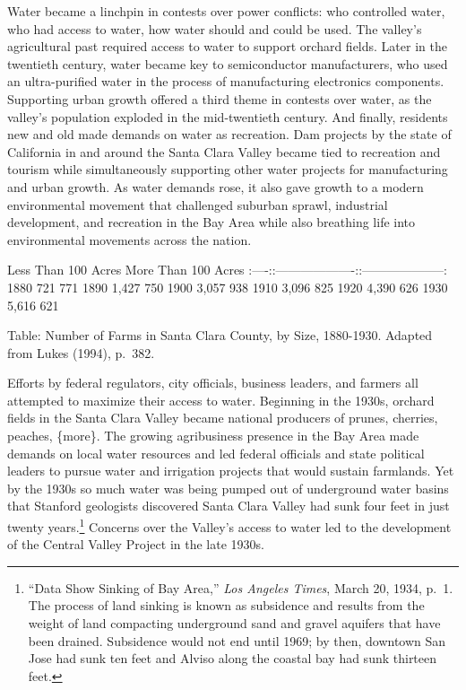 \documentclass[11pt,article,oneside]{memoir}
\begin{document}
Water became a linchpin in contests over power conflicts: who controlled
water, who had access to water, how water should and could be used. The
valley's agricultural past required access to water to support orchard
fields. Later in the twentieth century, water became key to
semiconductor manufacturers, who used an ultra-purified water in the
process of manufacturing electronics components. Supporting urban growth
offered a third theme in contests over water, as the valley's population
exploded in the mid-twentieth century. And finally, residents new and
old made demands on water as recreation. Dam projects by the state of
California in and around the Santa Clara Valley became tied to
recreation and tourism while simultaneously supporting other water
projects for manufacturing and urban growth. As water demands rose, it
also gave growth to a modern environmental movement that challenged
suburban sprawl, industrial development, and recreation in the Bay Area
while also breathing life into environmental movements across the
nation.

\textbar{} \textbar{} Less Than 100 Acres \textbar{} More Than 100 Acres
\textbar{}
\textbar{}:----:\textbar{}:-------------------:\textbar{}:--------------------:\textbar{}
\textbar{} 1880 \textbar{} 721 \textbar{} 771 \textbar{} \textbar{} 1890
\textbar{} 1,427 \textbar{} 750 \textbar{} \textbar{} 1900 \textbar{}
3,057 \textbar{} 938 \textbar{} \textbar{} 1910 \textbar{} 3,096
\textbar{} 825 \textbar{} \textbar{} 1920 \textbar{} 4,390 \textbar{}
626 \textbar{} \textbar{} 1930 \textbar{} 5,616 \textbar{} 621
\textbar{}

Table: Number of Farms in Santa Clara County, by Size, 1880-1930.
Adapted from Lukes (1994), p.~382.

Efforts by federal regulators, city officials, business leaders, and
farmers all attempted to maximize their access to water. Beginning in
the 1930s, orchard fields in the Santa Clara Valley became national
producers of prunes, cherries, peaches, \{more\}. The growing
agribusiness presence in the Bay Area made demands on local water
resources and led federal officials and state political leaders to
pursue water and irrigation projects that would sustain farmlands. Yet
by the 1930s so much water was being pumped out of underground water
basins that Stanford geologists discovered Santa Clara Valley had sunk
four feet in just twenty years.\footnote{``Data Show Sinking of Bay
  Area,'' \emph{Los Angeles Times}, March 20, 1934, p.~1. The process of
  land sinking is known as subsidence and results from the weight of
  land compacting underground sand and gravel aquifers that have been
  drained. Subsidence would not end until 1969; by then, downtown San
  Jose had sunk ten feet and Alviso along the coastal bay had sunk
  thirteen feet.} Concerns over the Valley's access to water led to the
development of the Central Valley Project in the late 1930s.
\end{document}
